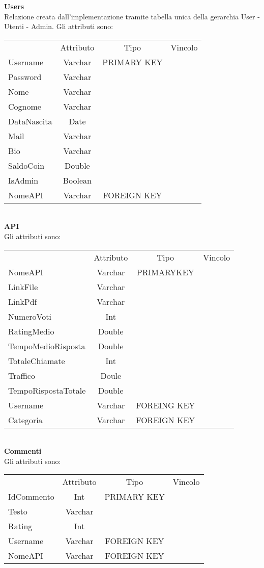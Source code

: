 {{		\textbf{Users}\\
			Relazione creata dall'implementazione tramite tabella unica della gerarchia User - Utenti - Admin. Gli attributi sono:
			\begin{center}
			\begin{tabular}{lccc}
				&Attributo&Tipo&Vincolo\\
				Username&Varchar&PRIMARY KEY\\
				Password&Varchar& \\				
				Nome&Varchar& \\
				Cognome&Varchar& \\
				DataNascita&Date& \\				
				Mail&Varchar& \\
				Bio&Varchar& \\
				SaldoCoin&Double& \\
				IsAdmin&Boolean& \\
				NomeAPI&Varchar&FOREIGN KEY\\
			\end{tabular}
			\end{center} \\					
			
		\textbf{API}\\
			Gli attributi sono:
			\begin{center}
			\begin{tabular}{lccc}
				&Attributo&Tipo&Vincolo\\
				NomeAPI&Varchar&PRIMARYKEY\\
				LinkFile&Varchar& \\
				LinkPdf&Varchar& \\
				NumeroVoti&Int& \\
				RatingMedio&Double& \\
				TempoMedioRisposta&Double& \\
				TotaleChiamate&Int& \\
				Traffico&Doule& \\
				TempoRispostaTotale&Double& \\
				Username&Varchar&FOREING KEY\\
				Categoria&Varchar&FOREIGN KEY\\
			\end{tabular}
			\end{center}\\
			
		\textbf{Commenti}\\
			Gli attributi sono:
			\begin{center}
			\begin{tabular}{lccc}
				&Attributo&Tipo&Vincolo\\
				IdCommento&Int&PRIMARY KEY\\
				Testo&Varchar& \\
				Rating&Int& \\
				Username&Varchar&FOREIGN KEY\\
				NomeAPI&Varchar&FOREIGN KEY\\
			\end{tabular}
			\end{center}\\
		
}}
